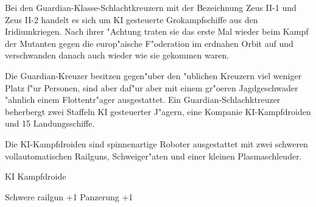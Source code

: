 
Bei den Guardian-Klasse-Schlachtkreuzern mit der Bezeichnung Zeus II-1 und Zeus II-2 handelt es sich um KI gesteuerte Gro\3kampfschiffe aus den Iridiumkriegen. Nach ihrer "Achtung traten sie das erste Mal wieder beim Kampf der Mutanten gegen die europ"aische F"oderation im erdnahen Orbit auf und verschwanden danach auch wieder wie sie gekommen waren.

Die Guardian-Kreuzer besitzen gegen"uber den "ublichen Kreuzern viel weniger Platz f"ur Personen, sind aber daf"ur aber mit einem gr"o\3eren Jagdgeschwader "ahnlich einem Flottentr"ager ausgestattet. Ein Guardian-Schlachktreuzer beherbergt zwei Staffeln KI gesteuerter J"agern, eine Kompanie KI-Kampfdroiden und 15 Landungsschiffe.

Die KI-Kampfdroiden sind spinnenartige Roboter ausgestattet mit zwei schweren vollautomatischen Railguns, Schwei\3ger"aten und einer kleinen Plasmaschleuder.

\begin{nscsheet}[f]{KI Kampfdroide}
    \nscstats[ATT=3,AGG=3,CON=2]
    \nscruler
    \begin{nscinventory}
        \nscitem[Waffen] Schwere railgun +1
        \nscitem[R"ustung] Panzerung +1
    \end{nscinventory}
\end{nscsheet}
